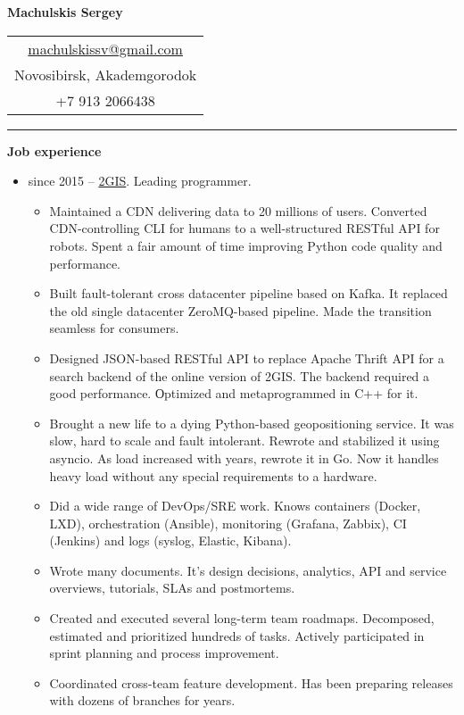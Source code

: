 \documentclass[final]{letter}
\begin{document}
\begin{center}

{\fontsize{25}{40}\selectfont\bf{Machulskis Sergey}}
  {\hfill
    \begin{tabular}{c}
        \href{mailto:machulskissv@gmail.com}{machulskissv@gmail.com}\\
        Novosibirsk, Akademgorodok \\
        +7 913 2066438\\
     \end{tabular}
  }
\rule{.98\textwidth}{1pt}

\addvspace{.1cm}

\end{center}

{\bf Job experience}
\begin{itemize}
  \item since 2015 -- \href{https://2gis.com}{2GIS}. Leading programmer.
  \begin{itemize}
  \item Maintained a CDN delivering data to 20 millions of users.
    Converted CDN-controlling CLI for humans to a well-structured RESTful API for robots.
    Spent a fair amount of time improving Python code quality and performance.
  \item Built fault-tolerant cross datacenter pipeline based on Kafka.
    It replaced the old single datacenter ZeroMQ-based pipeline. Made the transition seamless for consumers.
  \item Designed JSON-based RESTful API to replace Apache Thrift API for a search backend of the online version of 2GIS.
    The backend required a good performance. Оptimized and metaprogrammed in C++ for it.
  \item Brought a new life to a dying Python-based geopositioning service. It was slow, hard to scale and fault intolerant.
    Rewrote and stabilized it using asyncio. As load increased with years, rewrote it in Go. Now it handles heavy load without any special requirements to a hardware.
  \item Did a wide range of DevOps/SRE work. Knows containers (Docker, LXD), orchestration (Ansible), monitoring (Grafana, Zabbix), CI (Jenkins) and logs (syslog, Elastic, Kibana).
  \item Wrote many documents. It's design decisions, analytics, API and service overviews, tutorials, SLAs and postmortems.
  \item Created and executed several long-term team roadmaps. Decomposed, estimated and prioritized hundreds of tasks.
  Actively participated in sprint planning and process improvement.
  \item Coordinated cross-team feature development. Has been preparing releases with dozens of branches for years.
  \end{itemize}


\end{itemize}
\end{document}
